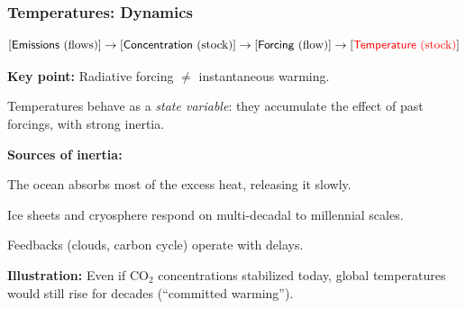 \documentclass[xcolor=x11names,compress,aspectratio=169]{beamer}%
\makeatletter
\renewenvironment{itemize}{\begin{compactitemize}[<+-| alert@+>]}{\end{compactitemize}}
\makeatother
\begin{document}
\begin{frame}%
%

\frametitle{Temperatures: Dynamics}%
%

\[
\lbrack\text{\textsf{Emissions} (flows)}]\rightarrow\lbrack
\text{\textsf{Concentration} (stock)}]\rightarrow\lbrack\text{\textsf{Forcing}
(flow)}]\rightarrow\lbrack\text{%
\color{red}%
\textsf{Temperature} (stock)%
\color{black}%
}]
\]


\medskip

\begin{itemize}
\item \textbf{Key point:} Radiative forcing $\neq$ instantaneous warming.

Temperatures behave as a \emph{state variable}: they accumulate the effect of
past forcings, with strong inertia.

\item \textbf{Sources of inertia:}

\begin{itemize}
\item The ocean absorbs most of the excess heat, releasing it slowly.

\item Ice sheets and cryosphere respond on multi-decadal to millennial scales.

\item Feedbacks (clouds, carbon cycle) operate with delays.
\end{itemize}

\item \textbf{Illustration: }Even if CO$_{2}$ concentrations stabilized today,
global temperatures would still rise for decades (\textquotedblleft committed
warming\textquotedblright).
\end{itemize}

%

\transboxout
\end{frame}%
%
\end{document}
